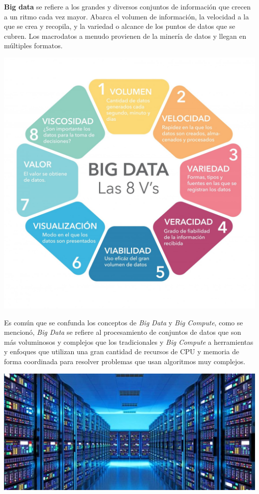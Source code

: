 \documentclass[
]{book}
\begin{document}
\textbf{Big data} se refiere a los grandes y diversos conjuntos de información que crecen a un ritmo cada vez mayor. Abarca el volumen de información, la velocidad a la que se crea y recopila, y la variedad o alcance de los puntos de datos que se cubren. Los macrodatos a menudo provienen de la minería de datos y llegan en múltiples formatos.

\begin{center}\includegraphics[width=600pt]{img/01-intro2ds/08_big-data-8vs} \end{center}

Es común que se confunda los conceptos de \emph{Big Data} y \emph{Big Compute}, como se mencionó, \emph{Big Data} se refiere al procesamiento de conjuntos de datos que son más voluminosos y complejos que los tradicionales y \emph{Big Compute} a herramientas y enfoques que utilizan una gran cantidad de recursos de CPU y memoria de forma coordinada para resolver problemas que usan algoritmos muy complejos.

\begin{center}\includegraphics[width=600pt]{img/01-intro2ds/09_bigdata} \end{center}
\end{document}
